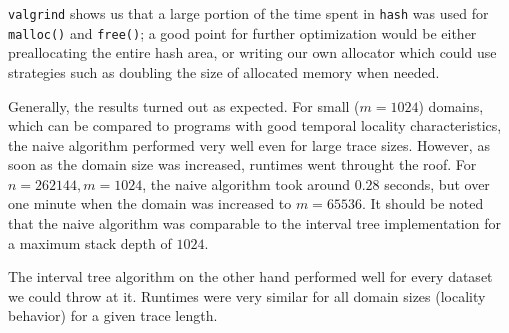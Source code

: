 \documentclass[a4paper,10pt]{article}
\begin{document}
\verb|valgrind| shows us that a large portion
of the time spent in \verb|hash| was
used for \lstinline|malloc()| and \lstinline|free()|; a good point for
further optimization would be either preallocating the entire hash area, or writing
our own allocator which could use strategies such as doubling the size of allocated
memory when needed.

Generally, the results turned out as expected. For small ($m = 1024$) domains, which can be compared
to programs with good temporal locality characteristics, the naive algorithm performed
very well even for large trace sizes. However, as soon as the domain size was increased,
runtimes went throught the roof. For $n = 262144, m = 1024$, the naive algorithm took around $0.28$ seconds,
but over one minute when the domain was increased to $m = 65536$. It should be noted that the
naive algorithm was comparable to the interval tree implementation for a maximum stack depth of $1024$.

The interval tree algorithm on the other hand performed well for every dataset we could throw
at it. Runtimes were very similar for all domain sizes (locality behavior) for a given trace
length.

\end{document}
